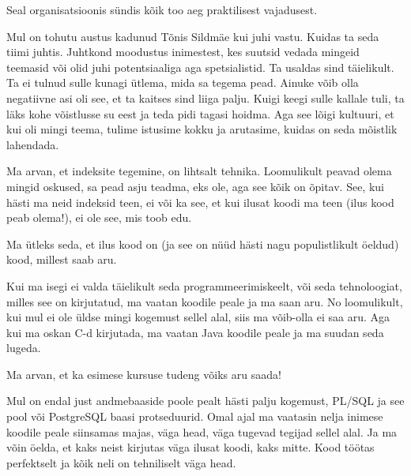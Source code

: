
Seal organisatsioonis sündis kõik too aeg praktilisest vajadusest. 

Mul on tohutu austus kadunud Tõnis Sildmäe kui juhi vastu. Kuidas ta seda tiimi juhtis. Juhtkond moodustus inimestest, kes suutsid vedada mingeid teemasid või olid juhi potentsiaaliga aga spetsialistid. Ta usaldas sind täielikult. Ta ei tulnud sulle kunagi ütlema, mida sa tegema pead. Ainuke võib olla negatiivne asi oli see, et ta kaitses sind liiga palju. Kuigi keegi sulle kallale tuli, ta läks kohe võistlusse su eest ja teda pidi tagasi hoidma. Aga see lõigi  kultuuri, et kui oli mingi teema, tulime istusime kokku ja arutasime, kuidas on seda mõistlik lahendada. 


Ma arvan, et indeksite tegemine, on lihtsalt tehnika. Loomulikult peavad olema mingid oskused, sa pead asju teadma, eks ole, aga see kõik on õpitav. See, kui hästi ma neid indeksid teen, ei või ka see, et kui ilusat koodi ma teen (ilus kood peab olema!), ei ole see, mis toob edu. 


Ma ütleks seda, et ilus kood on (ja see on nüüd hästi nagu populistlikult öeldud) kood, millest saab aru. 

Kui ma isegi ei valda täielikult seda programmeerimiskeelt, või seda tehnoloogiat, milles see on kirjutatud, ma vaatan koodile peale ja ma saan aru. No loomulikult, kui mul ei ole üldse mingi kogemust sellel alal, siis ma võib-olla ei saa aru. Aga kui ma oskan C-d  kirjutada, ma vaatan Java koodile peale ja ma suudan seda lugeda. 


Ma arvan, et ka esimese kursuse tudeng võiks aru saada!

Mul on endal just andmebaaside poole pealt hästi palju kogemust, PL/SQL ja see pool või PostgreSQL baasi protseduurid. Omal ajal ma vaatasin nelja inimese koodile peale siinsamas majas, väga head, väga tugevad tegijad sellel alal. Ja ma võin öelda, et kaks neist kirjutas väga ilusat koodi, kaks mitte. Kood töötas perfektselt ja kõik neli on tehniliselt väga head. 

